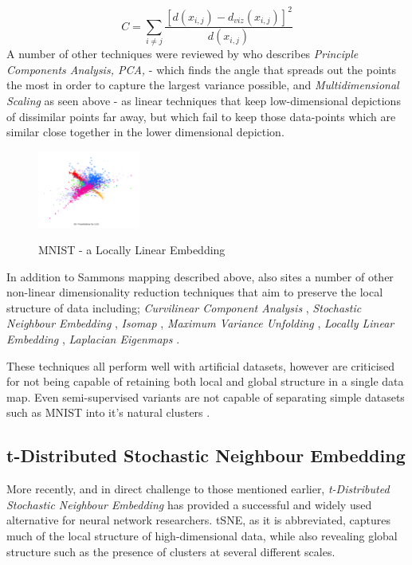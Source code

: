 \documentclass[a4paper,11pt,titlepage]{article}
\begin{document}
		$$
			C = 
			\sum\limits_{i \neq j}
			\frac{ [d(x_{i,j}) - d_{viz}(x_{i,j}) ]^2 }					{d(x_{i,j})}
		$$
		A number of other techniques were reviewed by \cite{VanderMaaten2009} who describes \textit{Principle Components Analysis, PCA,} \cite{Hotelling33} - which finds the angle that spreads out the points the most in order to capture the largest variance possible, and \textit{Multidimensional Scaling} as seen above - as linear techniques that keep low-dimensional depictions of dissimilar points far away, but which fail to keep those data-points which are similar close together in the lower dimensional depiction.
 		
 	\begin{figure}[H]
    			\centering	
			{{\includegraphics[width=0.3\textwidth]
    				{img/hinton_lle.png} 
    			}}%
    			\caption{MNIST - a Locally Linear Embedding}%
    		\label{fig:3nn}
	\end{figure}	 
 		
		\par 
		In addition to Sammons mapping described above, \cite{VanderMaaten2009} also sites a number of other non-linear dimensionality reduction techniques that aim to preserve the local structure of data including; \textit{Curvilinear Component Analysis} \cite{Demartines1995}, \textit{Stochastic Neighbour Embedding} \cite{Hinton2002}, \textit{Isomap} \cite{Tenenbaum2000}, \textit{Maximum Variance Unfolding} \cite{Weinberger2004}, \textit{Locally Linear Embedding} \cite{Roweis2000}, \textit{Laplacian Eigenmaps} \cite{Belkin2002}.

		\par 
		
		These techniques all perform well with artificial datasets, however are criticised for not being capable of retaining both local and global structure in a single data map. Even semi-supervised variants are not capable of separating simple datasets such as MNIST into it's natural clusters \cite{Song2007}. 
		\par 

	 		
 \subsection{t-Distributed Stochastic Neighbour Embedding}
		More recently, and in direct challenge to those mentioned earlier, \textit{t-Distributed Stochastic Neighbour Embedding} \cite{Maaten2008} has provided a successful and widely used alternative for neural network researchers. tSNE, as it is abbreviated, captures much of the local structure of high-dimensional data, while also revealing global structure such as the presence of clusters at several different scales.
		\par 
		
\end{document}

